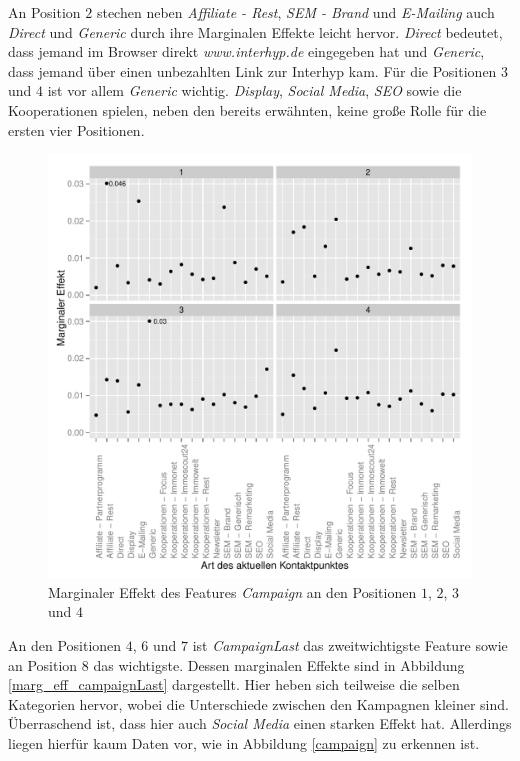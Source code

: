 An Position $2$ stechen neben \textit{Affiliate - Rest}, \textit{SEM - Brand} und \textit{E-Mailing} auch \textit{Direct} und \textit{Generic} durch ihre Marginalen Effekte leicht hervor. \textit{Direct} bedeutet, dass jemand im Browser direkt \textit{www.interhyp.de} eingegeben hat und \textit{Generic}, dass jemand über einen unbezahlten Link zur Interhyp kam.
Für die Positionen $3$ und $4$ ist vor allem \textit{Generic} wichtig. \textit{Display}, \textit{Social Media}, \textit{SEO} sowie die Kooperationen spielen, neben den bereits erwähnten, keine große Rolle für die ersten vier Positionen.
\begin{figure}[H]
	\centering\includegraphics[scale=0.75]{marg_eff_campaign.pdf}\caption[Marginaler Effekt von \textit{Campaign}]{Marginaler Effekt des Features \textit{Campaign} an den Positionen $1$, $2$, $3$ und $4$}\label{marg_eff_campaign}
\end{figure}
An den Positionen $4$, $6$ und $7$ ist \textit{CampaignLast} das zweitwichtigste Feature sowie an Position $8$ das wichtigste. Dessen marginalen Effekte sind in Abbildung \ref{marg_eff_campaignLast} dargestellt. Hier heben sich teilweise die selben Kategorien hervor, wobei die Unterschiede zwischen den Kampagnen kleiner sind. Überraschend ist, dass hier auch \textit{Social Media} einen starken Effekt hat. Allerdings liegen hierfür kaum Daten vor, wie in Abbildung \ref{campaign} zu erkennen ist.\\
